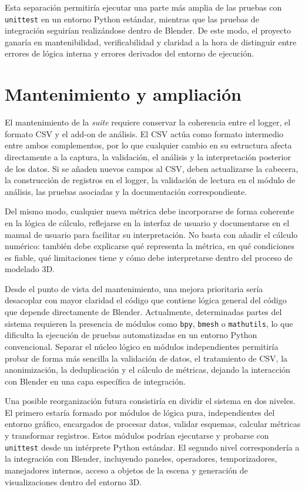 Esta separación permitiría ejecutar una parte más amplia de las pruebas con \texttt{unittest} en un entorno Python estándar, mientras que las pruebas de integración seguirían realizándose dentro de Blender. De este modo, el proyecto ganaría en mantenibilidad, verificabilidad y claridad a la hora de distinguir entre errores de lógica interna y errores derivados del entorno de ejecución.

\section{Mantenimiento y ampliación}
\label{sec:d-mantenimiento}

El mantenimiento de la \textit{suite} requiere conservar la coherencia entre el logger, el formato CSV y el add-on de análisis. El CSV actúa como formato intermedio entre ambos complementos, por lo que cualquier cambio en su estructura afecta directamente a la captura, la validación, el análisis y la interpretación posterior de los datos. Si se añaden nuevos campos al CSV, deben actualizarse la cabecera, la construcción de registros en el logger, la validación de lectura en el módulo de análisis, las pruebas asociadas y la documentación correspondiente.

Del mismo modo, cualquier nueva métrica debe incorporarse de forma coherente en la lógica de cálculo, reflejarse en la interfaz de usuario y documentarse en el manual de usuario para facilitar su interpretación. No basta con añadir el cálculo numérico: también debe explicarse qué representa la métrica, en qué condiciones es fiable, qué limitaciones tiene y cómo debe interpretarse dentro del proceso de modelado 3D.

Desde el punto de vista del mantenimiento, una mejora prioritaria sería desacoplar con mayor claridad el código que contiene lógica general del código que depende directamente de Blender. Actualmente, determinadas partes del sistema requieren la presencia de módulos como \texttt{bpy}, \texttt{bmesh} o \texttt{mathutils}, lo que dificulta la ejecución de pruebas automatizadas en un entorno Python convencional. Separar el núcleo lógico en módulos independientes permitiría probar de forma más sencilla la validación de datos, el tratamiento de CSV, la anonimización, la deduplicación y el cálculo de métricas, dejando la interacción con Blender en una capa específica de integración.

Una posible reorganización futura consistiría en dividir el sistema en dos niveles. El primero estaría formado por módulos de lógica pura, independientes del entorno gráfico, encargados de procesar datos, validar esquemas, calcular métricas y transformar registros. Estos módulos podrían ejecutarse y probarse con \texttt{unittest} desde un intérprete Python estándar. El segundo nivel correspondería a la integración con Blender, incluyendo paneles, operadores, temporizadores, manejadores internos, acceso a objetos de la escena y generación de visualizaciones dentro del entorno 3D.


